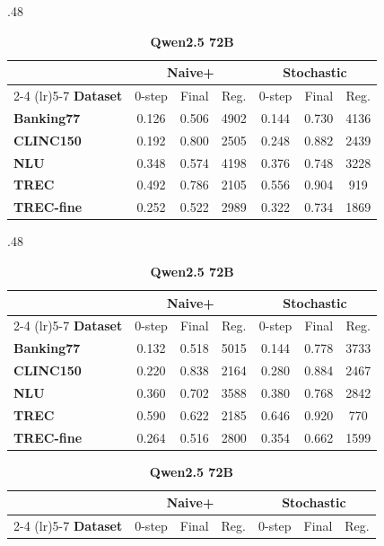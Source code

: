 \documentclass{article}
\theoremstyle{plain}
\theoremstyle{definition}
\theoremstyle{remark}
\newcommand{\banking}{Banking77\xspace}
\newcommand{\clinic}{CLINC150\xspace}
\newcommand{\trec}{TREC\xspace}
\newcommand{\trecfine}{TREC-fine\xspace}
\newcommand{\nlu}{NLU\xspace}
\newcommand{\naiveplusshort}{Naive+\xspace}
\newcommand{\expshort}{Stochastic\xspace}
\begin{document}
\begin{table}[t]
\begin{subtable}{.48\textwidth}
\begin{tabular}{l ccc ccc}
\toprule
 & \multicolumn{3}{c}{\textbf{\naiveplusshort}}
 & \multicolumn{3}{c}{\textbf{\expshort}}\\
\cmidrule(lr){2-4}
\cmidrule(lr){5-7}
\textbf{Dataset}
& 0-step & Final & Reg.
& 0-step & Final & Reg.\\
\midrule
\textbf{\banking}   & 0.126 & 0.506 & 4902 & 0.144 & 0.730 & 4136 \\
\textbf{\clinic}    & 0.192 & 0.800 & 2505 & 0.248 & 0.882 & 2439 \\
\textbf{\nlu}       & 0.348 & 0.574 & 4198 & 0.376 & 0.748 & 3228 \\
\textbf{\trec}      & 0.492 & 0.786 & 2105 & 0.556 & 0.904 & 919  \\
\textbf{\trecfine}  & 0.252 & 0.522 & 2989 & 0.322 & 0.734 & 1869 \\
\midrule[\heavyrulewidth]
\end{tabular}
\end{subtable}
\hfill
\begin{subtable}{.48\textwidth}
\caption{\textbf{Qwen2.5 32B}}
\centering
\begin{tabular}{l ccc ccc}
\toprule
 & \multicolumn{3}{c}{\textbf{\naiveplusshort}}
 & \multicolumn{3}{c}{\textbf{\expshort}}\\
\cmidrule(lr){2-4}
\cmidrule(lr){5-7}
\textbf{Dataset}
& 0-step & Final & Reg.
& 0-step & Final & Reg.\\
\midrule
\textbf{\banking}   & 0.132 & 0.518 & 5015 & 0.144 & 0.778 & 3733 \\
\textbf{\clinic}    & 0.220 & 0.838 & 2164 & 0.280 & 0.884 & 2467 \\
\textbf{\nlu}       & 0.360 & 0.702 & 3588 & 0.380 & 0.768 & 2842 \\
\textbf{\trec}      & 0.590 & 0.622 & 2185 & 0.646 & 0.920 & 770  \\
\textbf{\trecfine}  & 0.264 & 0.516 & 2800 & 0.354 & 0.662 & 1599 \\
\midrule[\heavyrulewidth]
\end{tabular}
\end{subtable}
\vspace{1em}
\begin{subtable}{\textwidth}
\caption{\textbf{Qwen2.5 72B}}
\centering
\begin{tabular}{l ccc ccc}
\toprule
 & \multicolumn{3}{c}{\textbf{\naiveplusshort}}
 & \multicolumn{3}{c}{\textbf{\expshort}}\\
\cmidrule(lr){2-4}
\cmidrule(lr){5-7}
\textbf{Dataset}
& 0-step & Final & Reg.
& 0-step & Final & Reg.\\

\end{tabular}
\end{subtable}
\end{table}
\end{document}
